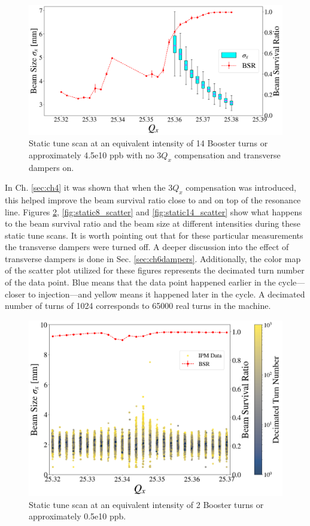 \begin{figure}[H]
    \centering
    \includegraphics[width=\columnwidth]{chapter6/static14turns_BARE_dampersON.png}
    \caption{Static tune scan at an equivalent intensity of 14 Booster turns or approximately 4.5e10 ppb with no $3Q_x$ compensation and transverse dampers on.}
    \label{fig:static14_bare}
\end{figure}

In Ch. \ref{sec:ch4} it was shown that when the $3Q_x$ compensation was introduced, this helped improve the beam survival ratio close to and on top of the resonance line. Figures \ref{fig:static2_scatter}, \ref{fig:static8_scatter} and \ref{fig:static14_scatter} show what happens to the beam survival ratio and the beam size at different intensities during these static tune scans. It is worth pointing out that for these particular measurements the transverse dampers were turned off. A deeper discussion into the effect of transverse dampers is done in Sec. \ref{sec:ch6dampers}. Additionally, the color map of the scatter plot utilized for these figures represents the decimated turn number of the data point. Blue means that the data point happened earlier in the cycle---closer to injection---and yellow means it happened later in the cycle. A decimated number of turns of 1024 corresponds to 65000 real turns in the machine.

\begin{figure}[H]
    \centering
    \includegraphics[width=\columnwidth]{chapter6/static2turns_dampersOFF.png}
    \caption{Static tune scan at an equivalent intensity of 2 Booster turns or approximately 0.5e10 ppb.}
    \label{fig:static2_scatter}
\end{figure}

